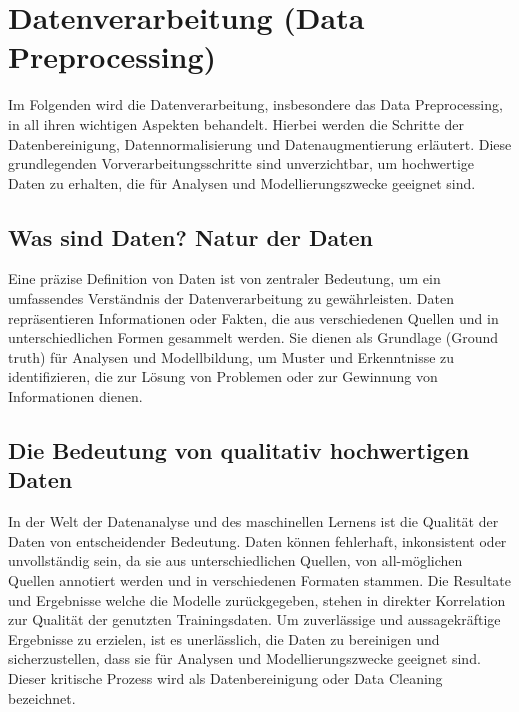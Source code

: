 \chapter{Datenverarbeitung (Data Preprocessing)}

Im Folgenden wird die Datenverarbeitung, insbesondere das Data Preprocessing, in all ihren wichtigen Aspekten behandelt.
Hierbei werden die Schritte der Datenbereinigung, Datennormalisierung und Datenaugmentierung erläutert.
Diese grundlegenden Vorverarbeitungsschritte sind unverzichtbar, um hochwertige Daten zu erhalten, die für Analysen und Modellierungszwecke geeignet sind.

\section{Was sind Daten? Natur der Daten}

Eine präzise Definition von Daten ist von zentraler Bedeutung, um ein umfassendes Verständnis der Datenverarbeitung zu gewährleisten.
Daten repräsentieren Informationen oder Fakten, die aus verschiedenen Quellen und in unterschiedlichen Formen gesammelt werden.
Sie dienen als Grundlage (Ground truth) für Analysen und Modellbildung, um Muster und Erkenntnisse zu identifizieren, die zur Lösung von Problemen oder zur Gewinnung von Informationen dienen.

\section{Die Bedeutung von qualitativ hochwertigen Daten}

In der Welt der Datenanalyse und des maschinellen Lernens ist die Qualität der Daten von entscheidender Bedeutung.
Daten können fehlerhaft, inkonsistent oder unvollständig sein, da sie aus unterschiedlichen Quellen, von all-möglichen Quellen annotiert werden und in verschiedenen Formaten stammen.
Die Resultate und Ergebnisse welche die Modelle zurückgegeben, stehen in direkter Korrelation zur Qualität der genutzten Trainingsdaten.
Um zuverlässige und aussagekräftige Ergebnisse zu erzielen, ist es unerlässlich, die Daten zu bereinigen und sicherzustellen, dass sie für Analysen und Modellierungszwecke geeignet sind.
Dieser kritische Prozess wird als Datenbereinigung oder Data Cleaning bezeichnet.

